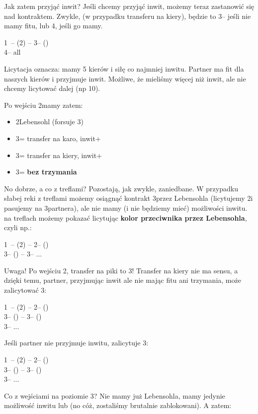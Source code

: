 \documentclass[12pt, a4paper]{article}
\begin{document}
Jak zatem przyjąć inwit? Jeśli chcemy przyjąć inwit, możemy teraz zastanowić się nad kontraktem.
Zwykle, (w przypadku transferu na kiery), będzie to 3\nt -- jeśli nie mamy fitu, lub 4\hearts, jeśli go mamy.

1\nt\ -- (2\spades) -- 3\diams -- (\pass)\\
4\hearts -- all \pass

Licytacja oznacza: mamy 5 kierów i siłę co najmniej inwitu. Partner ma fit dla naszych kierów i
przyjmuje inwit. Możliwe, że mieliśmy więcej niż inwit, ale nie chcemy licytować dalej (np 10\hcp).

Po wejściu 2\spades mamy zatem:
\begin{itemize}
    \item 2\nt Lebensohl (forsuje 3\clubs)
    \item 3\clubs = transfer na karo, inwit+
    \item 3\diams = transfer na kiery, inwit+
    \item 3\nt = \gf \textbf{bez trzymania}
\end{itemize}

No dobrze, a co z treflami? Pozostają, jak zwykle,
zaniedbane. W przypadku słabej reki z treflami możemy
osiągnąć kontrakt 3\clubs przez Lebensohla (licytujemy
2\nt i pasujemy na 3\clubs partnera), ale nie mamy (i nie będziemy mieć) możliwości
inwitu. \gf na treflach możemy pokazać licytując \textbf{kolor przeciwnika przez Lebensohla}, czyli np.:

1\nt\ -- (2\spades) -- 2\nt -- (\pass)\\
3\clubs -- (\pass) -- 3\spades -- ...

Uwaga! Po wejściu 2\hearts, transfer na piki to 3\diams! Transfer na kiery nie ma sensu,
a dzięki temu, partner, przyjmując inwit ale nie mając fitu ani trzymania, może zalicytować 3\hearts:

1\nt\ -- (2\hearts) -- 2\nt -- (\pass)\\
3\clubs -- (\pass) -- 3\diams -- (\pass)\\
3\hearts -- ...

Jeśli partner nie przyjmuje inwitu, zalicytuje 3\spades:

1\nt\ -- (2\hearts) -- 2\nt -- (\pass)\\
3\clubs -- (\pass) -- 3\diams -- (\pass)\\
3\spades -- ...

Co z wejściami na poziomie 3? Nie mamy już Lebensohla,
mamy jedynie możliwość inwitu lub \gf (no cóż, zostaliśmy
brutalnie zablokowani). A zatem:
\end{document}
